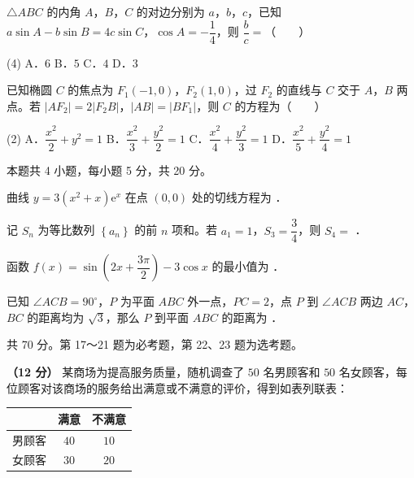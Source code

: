 $\triangle ABC$ 的内角 $A$，$B$，$C$ 的对边分别为 $a$，$b$，$c$，已知 $a\sin A-b\sin B=4c\sin C$，$\cos A=-\dfrac14$，则 $\dfrac bc=$（　　）

\begin{gkopts}(4)
\task A．$6$
\task B．$5$
\task C．$4$
\task D．$3$
\end{gkopts}

已知椭圆 $C$ 的焦点为 $F_1(-1,0)$，$F_2(1,0)$，过 $F_2$ 的直线与 $C$ 交于 $A$，$B$ 两点。若 $\left|AF_2\right|=2\left|F_2B\right|$，$|AB|=\left|BF_1\right|$，则 $C$ 的方程为（　　）

\begin{gkopts}(2)
\task A．$\dfrac{x^{2}}2+y^{2}=1$
\task B．$\dfrac{x^{2}}3+\dfrac{y^{2}}2=1$
\task C．$\dfrac{x^{2}}4+\dfrac{y^{2}}3=1$
\task D．$\dfrac{x^{2}}5+\dfrac{y^{2}}4=1$
\end{gkopts}

\par\medskip


\begin{gktip}
本题共 4 小题，每小题 5 分，共 20 分。
\end{gktip}

曲线 $y=3\left(x^{2}+x\right)\mathrm e^{x}$ 在点 $(0,0)$ 处的切线方程为 \gkblank{}．

记 $S_n$ 为等比数列 $\left\{a_n\right\}$ 的前 $n$ 项和。若 $a_1=1$，$S_3=\dfrac34$，则 $S_4=$ \gkblank{}．

函数 $f(x)=\sin\left(2x+\dfrac{3\pi}2\right)-3\cos x$ 的最小值为 \gkblank{}．

已知 $\angle ACB=90^\circ$，$P$ 为平面 $ABC$ 外一点，$PC=2$，点 $P$ 到 $\angle ACB$ 两边 $AC$，$BC$ 的距离均为 $\sqrt3$，那么 $P$ 到平面 $ABC$ 的距离为 \gkblank{}．

\par\medskip


\begin{gktip}
共 70 分。第 17～21 题为必考题，第 22、23 题为选考题。
\end{gktip}


\textbf{（12 分）} 某商场为提高服务质量，随机调查了 $50$ 名男顾客和 $50$ 名女顾客，每位顾客对该商场的服务给出满意或不满意的评价，得到如表列联表：

\begin{center}
\begin{tabular}{ccc}
\toprule
 & 满意 & 不满意 \\
\midrule
男顾客 & $40$ & $10$ \\
女顾客 & $30$ & $20$ \\
\bottomrule
\end{tabular}
\end{center}

